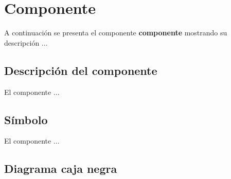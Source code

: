 


\section{Componente}
\normalsize
A continuación se presenta el componente \textbf{componente} mostrando su descripción ...
\subsection{Descripción del componente}
\scriptsize

\normalsize

	El componente ...
\subsection{Símbolo}
\scriptsize

\normalsize

	El componente ...
\subsection{Diagrama caja negra}
\scriptsize

